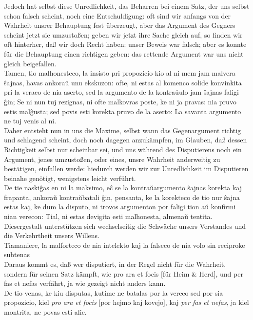 \documentclass{book}
\newcommand{\de}[1]{{\color{red}#1}\\}
\newcommand{\eo}[1]{#1\\}
\newcommand{\eble}[1]{{\color{blue}#1}}
\begin{document}
\de{Jedoch hat selbst diese Unredlichkeit, das Beharren bei einem Satz,
der uns selbst schon falsch scheint, noch eine Entschuldigung: oft sind
wir anfangs von der Wahrheit unsrer Behauptung fest überzeugt, aber das
Argument des Gegners scheint jetzt sie umzustoßen; geben wir jetzt ihre
Sache gleich auf, so finden wir oft hinterher, daß wir doch Recht haben:
unser Beweis war falsch; aber es konnte für die Behauptung einen
richtigen geben: das rettende Argument war uns nicht gleich
beigefallen.}
\eo{Tamen, tio malhonesteco, la insisto pri propozicio kio al ni mem jam
malvera ŝajnas, havas ankoraŭ unu ekskuzon: ofte, ni estas al komenco
solide konvinkita pri la veraco de nia aserto, sed la argumento de la
kontraŭulo jam ŝajnas \eble{faligi} ĝin; Se ni nun tuj rezignas, ni ofte
malkovras poste, ke ni ja pravas: nia pruvo estis malĝusta; sed povis
esti korekta pruvo de la aserto: La savanta argumento ne tuj venis al
ni.}
\de{Daher entsteht nun in uns die Maxime, selbst wann das Gegenargument
richtig und schlagend scheint, doch noch dagegen anzukämpfen, im Glauben,
daß dessen Richtigkeit selbst nur scheinbar sei, und uns während des
Disputierens noch ein Argument, jenes umzustoßen, oder eines, unsre
Wahrheit anderweitig zu bestätigen, einfallen werde: hiedurch werden wir
zur Unredlichkeit im Disputieren beinahe genötigt, wenigstens leicht
verführt. }
\eo{De tie naskiĝas en ni la maksimo, eĉ se la kontraŭargumento ŝajnas
korekta kaj frapanta, ankoraŭ kontraŭbatali ĝin, pensanta, ke la
korekteco de tio nur ŝajna estas kaj, ke dum la disputo, ni trovos
argumenton por faligi tion aŭ konfirmi nian verecon: Tial, ni estas
devigita esti malhonesta, almenaŭ tentita.}
\de{Diesergestalt unterstützen sich wechselseitig die Schwäche unsers
Verstandes und die Verkehrtheit unsers Willens. }
\eo{Tiamaniere, la malforteco de nia intelekto kaj la falseco de nia volo
sin reciproke \eble{subtenas}}
\de{Daraus kommt es, daß wer disputiert, in der Regel nicht für die
Wahrheit, sondern für seinen Satz kämpft, wie pro ara et focis [für Heim
\& Herd], und per fas et nefas verfährt, ja wie gezeigt nicht anders
kann.}
\eo{De tio venas, ke kiu disputas, kutime ne batalas por la vereco sed
por sia propozicio, kiel \textit{pro ara et focis} [por hejmo kaj
kovejo], kaj \textit{per fas et nefas}, ja kiel montrita, ne povas esti
alie.}
\end{document}
